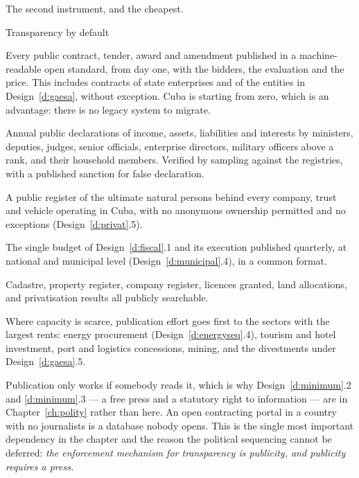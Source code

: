 The second instrument, and the cheapest.

\begin{design}{Transparency by default}
\label{d:transparency}
\begin{rules}
 Every public contract, tender, award and amendment
published in a machine-readable open standard, from day one, with the bidders,
the evaluation and the price. This includes contracts of state enterprises and of
the entities in Design~\ref{d:gaesa}, without exception. Cuba is starting from
zero, which is an advantage: there is no legacy system to migrate.

 Annual public declarations of income, assets,
liabilities and interests by ministers, deputies, judges, senior officials,
enterprise directors, military officers above a rank, and their household
members. Verified by sampling against the registries, with a published sanction
for false declaration.

 A public register of the ultimate natural
persons behind every company, trust and vehicle operating in Cuba, with no
anonymous ownership permitted and no exceptions
(Design~\ref{d:privat}.5).

 The single budget of Design~\ref{d:fiscal}.1 and its
execution published quarterly, at national and municipal level
(Design~\ref{d:municipal}.4), in a common format.

 Cadastre, property register, company register, licences
granted, land allocations, and privatisation results all publicly searchable.

 Where capacity is scarce, publication effort goes first
to the sectors with the largest rents: energy procurement
(Design~\ref{d:energyseq}.4), tourism and hotel investment, port and logistics
concessions, mining, and the divestments under Design~\ref{d:gaesa}.5.
\end{rules}
\end{design}

Publication only works if somebody reads it, which is why
Design~\ref{d:minimum}.2 and \ref{d:minimum}.3 --- a free press and a statutory
right to information --- are in Chapter~\ref{ch:polity} rather than here. An open
contracting portal in a country with no journalists is a database nobody opens.
This is the single most important dependency in the chapter and the reason the
political sequencing cannot be deferred: \emph{the enforcement mechanism for
transparency is publicity, and publicity requires a press.}

